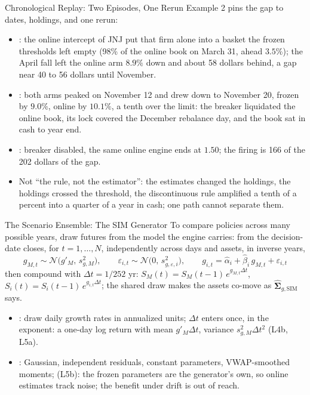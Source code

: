 \documentclass[aspectratio=169,11pt]{beamer}
\newcommand{\SigSIM}{\hat{\boldsymbol{\Sigma}}_{g,\mathrm{SIM}}}
\begin{document}
\begin{frame}{Chronological Replay: Two Episodes, One Rerun}
  \vspace{-0.2em}
  Example 2 pins the gap to dates, holdings, and one rerun:
  \begin{itemize}\setlength{\itemsep}{0.25em}
    \item {}: the online intercept of JNJ put that firm alone into a
      basket the frozen thresholds left empty (98\% of the online book on March 31,
      ahead $3.5\%$); the April fall left the online arm $8.9\%$ down and about 58
      dollars behind, a gap near 40 to 56 dollars until November.
    \item {}: both arms peaked on November 12 and drew down to
      November 20, frozen by $9.0\%$, online by $10.1\%$, a tenth over the limit:
      the breaker liquidated the online book, its lock covered the December
      rebalance day, and the book sat in cash to year end.
    \item {}: breaker disabled, the same online engine ends at
      $1.50$; the firing is 166 of the 202 dollars of the gap.
    \item Not ``the rule, not the estimator'': the estimates changed the holdings,
      the holdings crossed the threshold, the discontinuous rule amplified a tenth
      of a percent into a quarter of a year in cash; one path cannot separate them.
  \end{itemize}
\end{frame}

\begin{frame}{The Scenario Ensemble: The SIM Generator}
  \vspace{-0.3em}
  To compare policies across many possible years, draw futures from the model
  the engine carries: from the decision-date closes, for $t=1,\ldots,N$,
  independently across days and assets, in inverse years,
  \[
    \boxed{g_{M,t}\sim\mathcal N\bigl(g'_M,\,s^2_{g,M}\bigr),\qquad
      \varepsilon_{i,t}\sim\mathcal N\bigl(0,\,s^2_{g,\varepsilon,i}\bigr),\qquad
      g_{i,t}=\hat\alpha_i+\hat\beta_i\,g_{M,t}+\varepsilon_{i,t}}
  \]
  then compound with $\Delta t=1/252$ yr: $S_M(t)=S_M(t-1)\,e^{g_{M,t}\Delta t}$,
  $S_i(t)=S_i(t-1)\,e^{g_{i,t}\Delta t}$; the shared draw makes the assets co-move as $\SigSIM$ says.
  \vspace{-0.2em}
  \begin{itemize}\setlength{\itemsep}{0.15em}
    \item {}: draw daily growth rates in annualized units; $\Delta t$
      enters once, in the exponent: a one-day log return with mean $g'_M\Delta t$,
      variance $s^2_{g,M}\Delta t^2$ (L4b, L5a).
    \item {}: Gaussian, independent
      residuals, constant parameters, VWAP-smoothed moments;  (L5b): the frozen parameters are the generator's own, so online
      estimates track noise; the benefit under drift is out of reach.
  \end{itemize}
\end{frame}
\end{document}
